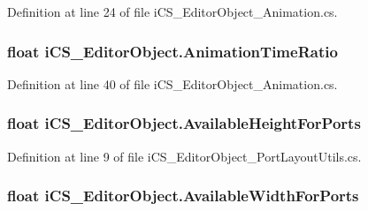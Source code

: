 Definition at line 24 of file i\+C\+S\+\_\+\+Editor\+Object\+\_\+\+Animation.\+cs.

\hypertarget{classi_c_s___editor_object_aeea1d3df75dbe78543f7c865a76ebfe7}{
\subsubsection[{Animation\+Time\+Ratio}]{\setlength{\rightskip}{0pt plus 5cm}float i\+C\+S\+\_\+\+Editor\+Object.\+Animation\+Time\+Ratio\hspace{0.3cm}{\ttfamily [get]}}}\label{classi_c_s___editor_object_aeea1d3df75dbe78543f7c865a76ebfe7}


Definition at line 40 of file i\+C\+S\+\_\+\+Editor\+Object\+\_\+\+Animation.\+cs.

\hypertarget{classi_c_s___editor_object_a24b2f1c4801d36370ee872c2f35589bb}{
\subsubsection[{Available\+Height\+For\+Ports}]{\setlength{\rightskip}{0pt plus 5cm}float i\+C\+S\+\_\+\+Editor\+Object.\+Available\+Height\+For\+Ports\hspace{0.3cm}{\ttfamily [get]}}}\label{classi_c_s___editor_object_a24b2f1c4801d36370ee872c2f35589bb}


Definition at line 9 of file i\+C\+S\+\_\+\+Editor\+Object\+\_\+\+Port\+Layout\+Utils.\+cs.

\hypertarget{classi_c_s___editor_object_a72aaf4c0dbac9e16e93f3d2bacc39e13}{
\subsubsection[{Available\+Width\+For\+Ports}]{\setlength{\rightskip}{0pt plus 5cm}float i\+C\+S\+\_\+\+Editor\+Object.\+Available\+Width\+For\+Ports\hspace{0.3cm}{\ttfamily [get]}}}\label{classi_c_s___editor_object_a72aaf4c0dbac9e16e93f3d2bacc39e13}


